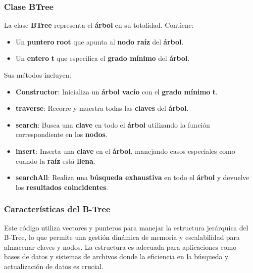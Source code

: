 \documentclass[12pt]{article}
\begin{document}
\begin{flushleft}
            
            \subsubsection{Clase BTree}
                \noindent\hspace*{4em}La clase \textbf{BTree} representa el \textbf{árbol} en su totalidad. Contiene:
                
                \begin{itemize}[left=4em]  %
                    \item Un \textbf{puntero} \textbf{root} que apunta al \textbf{nodo raíz} del \textbf{árbol}.
                    \item Un \textbf{entero} \textbf{t} que especifica el \textbf{grado mínimo} del \textbf{árbol}.
                \end{itemize}
                
                \noindent\hspace*{4em}Sus métodos incluyen:
                
                \begin{itemize}[left=4em]  %
                    \item \textbf{Constructor}: Inicializa un \textbf{árbol vacío} con el \textbf{grado mínimo} \textbf{t}.
                    \item \textbf{traverse}: Recorre y muestra todas las \textbf{claves} del \textbf{árbol}.
                    \item \textbf{search}: Busca una \textbf{clave} en todo el \textbf{árbol} utilizando la función correspondiente en los \textbf{nodos}.
                    \item \textbf{insert}: Inserta una \textbf{clave} en el \textbf{árbol}, manejando casos especiales como cuando la \textbf{raíz} está \textbf{llena}.
                    \item \textbf{searchAll}: Realiza una \textbf{búsqueda exhaustiva} en todo el \textbf{árbol} y devuelve los \textbf{resultados coincidentes}.
                \end{itemize}
            
            \subsubsection{Características del B-Tree}
                \noindent\hspace*{4em}Este código utiliza vectores y punteros para manejar la estructura jerárquica del B-Tree, lo que permite una gestión dinámica de memoria y escalabilidad para almacenar claves y nodos. La estructura es adecuada para aplicaciones como bases de datos y sistemas de archivos donde la eficiencia en la búsqueda y actualización de datos es crucial.
                

\end{flushleft}
\end{document}
